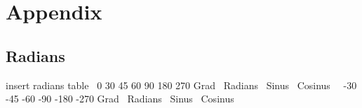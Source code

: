 \section{Appendix}

\subsection{Radians}

insert radians table \
        0       30      45      60      90      180     270
Grad \
Radians \
Sinus \
Cosinus \
\
       -30      -45      -60      -90      -180     -270
Grad \
Radians \
Sinus \
Cosinus \
